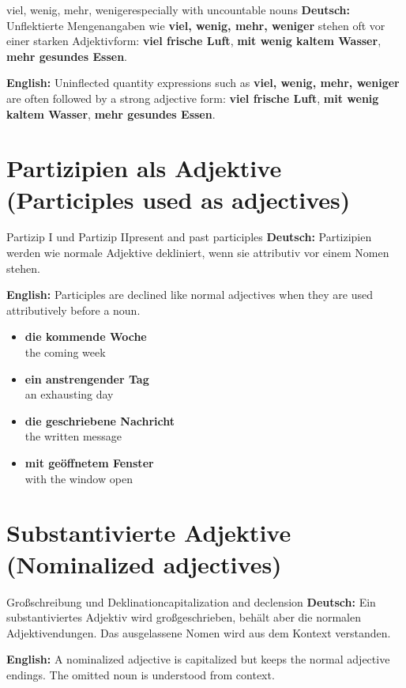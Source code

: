 \documentclass[a4paper,11pt]{article}
\newcommand{\GermanText}[1]{\textbf{Deutsch: }#1\par}
\newcommand{\EnglishText}[1]{{\small\color{SoftGray}\textbf{English: }#1\par}}
\newcommand{\ExampleItem}[2]{\item \textbf{#1}\\{\small\color{SoftGray}#2}}
\begin{document}
\begin{grammarentry}{viel, wenig, mehr, weniger}{especially with uncountable nouns}
\GermanText{Unflektierte Mengenangaben wie \textbf{viel, wenig, mehr, weniger} stehen oft vor einer starken Adjektivform: \textbf{viel frische Luft}, \textbf{mit wenig kaltem Wasser}, \textbf{mehr gesundes Essen}.}
\EnglishText{Uninflected quantity expressions such as \textbf{viel, wenig, mehr, weniger} are often followed by a strong adjective form: \textbf{viel frische Luft}, \textbf{mit wenig kaltem Wasser}, \textbf{mehr gesundes Essen}.}
\end{grammarentry}

\section{Partizipien als Adjektive \textnormal{(Participles used as adjectives)}}

\begin{grammarentry}{Partizip I und Partizip II}{present and past participles}
\GermanText{Partizipien werden wie normale Adjektive dekliniert, wenn sie attributiv vor einem Nomen stehen.}
\EnglishText{Participles are declined like normal adjectives when they are used attributively before a noun.}
\end{grammarentry}

\begin{exbox}
\begin{itemize}
\ExampleItem{die kommende Woche}{the coming week}
\ExampleItem{ein anstrengender Tag}{an exhausting day}
\ExampleItem{die geschriebene Nachricht}{the written message}
\ExampleItem{mit geöffnetem Fenster}{with the window open}
\end{itemize}
\end{exbox}

\section{Substantivierte Adjektive \textnormal{(Nominalized adjectives)}}

\begin{grammarentry}{Großschreibung und Deklination}{capitalization and declension}
\GermanText{Ein substantiviertes Adjektiv wird großgeschrieben, behält aber die normalen Adjektivendungen. Das ausgelassene Nomen wird aus dem Kontext verstanden.}
\EnglishText{A nominalized adjective is capitalized but keeps the normal adjective endings. The omitted noun is understood from context.}
\end{grammarentry}
\end{document}
